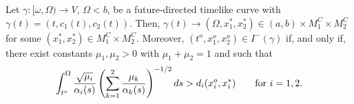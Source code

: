 \begin{prop}\label{pastofcurve}
  Let $\gamma:[\omega,\Omega)\rightarrow V$, $\Omega<b$, be a future-directed timelike curve with $\gamma(t)=(t,c_1(t),c_2(t))$. Then, $\gamma(t)\rightarrow (\Omega, x_1^*,x_2^*)\in (a,b)\times M_1^C\times M_2^C$ for some $(x_1^*,x_2^*)\in M_1^C\times M_2^C$. Moreover, $(t^o,x_1^o,x_2^o)\in I^-(\gamma)$ if, and only if, there exist constants $\mu_{1},\mu_{2}>0$ with $\mu_{1}+\mu_{2}=1$ and
such that
\begin{equation}
  \label{eq:5}
\int_{t^{o}}^{\Omega} \frac{\sqrt{\mu_{i}}}{\alpha_{i}(s)}\left(\sum_{k=1}^{2} \frac{\mu_{k}}{\alpha_{k}(s)} \right)^{-1/2}ds >
d_{i}(x^{o}_{i},x^{*}_{i})\qquad\hbox{for $i=1,2$.}
\end{equation}
\end{prop}


